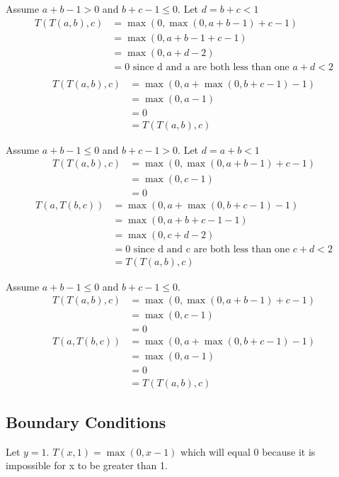 \documentclass{article}
\begin{document}
Assume $a+b-1 > 0$ and $b+c-1 \leq 0$. Let $d = b+c < 1$
\begin{align*}
	T(T(a,b),c) &= \max(0, \max(0, a+b-1) + c - 1)\\
				&= \max(0, a+b-1 + c - 1)\\
				&= \max(0, a+d-2)\\
				&=0 \text{ since d and a are both less than one } a+d < 2\\
\end{align*}
\begin{align*}
	T(T(a,b),c) &= \max(0, a + \max(0, b+c-1) - 1)\\
				&= \max(0, a - 1)\\
				&= 0\\
				&=T(T(a,b),c)
\end{align*}

Assume $a+b-1 \leq 0$ and $b+c-1 > 0$. Let $d = a+b < 1$
\begin{align*}
	T(T(a,b),c) &= \max(0, \max(0, a+b-1) + c - 1)\\
				&= \max(0, c - 1)\\
				&= 0
\end{align*}
\begin{align*}
	T(a,T(b,c)) &= \max(0, a+\max(0,b+c-1) - 1)\\
				&= \max(0, a+b+c-1 - 1)\\
				&= \max(0, c+d-2)\\
				&=0 \text{ since d and c are both less than one } c+d < 2\\
				&=T(T(a,b),c)
\end{align*}

Assume $a+b-1 \leq 0$ and $b+c-1 \leq 0$.
\begin{align*}
	T(T(a,b),c) &= \max(0, \max(0, a+b-1) + c - 1)\\
				&= \max(0, c - 1)\\
				&=0
\end{align*}
\begin{align*}
	T(a,T(b,c)) &= \max(0, a+\max(0,b+c-1) - 1)\\
				&= \max(0, a- 1)\\
				&=0\\
				&=T(T(a,b),c)
\end{align*}

\subsection*{Boundary Conditions}
Let $y=1$. $T(x,1) = \max(0, x-1)$ which will equal 0 because it is impossible for x to be greater than 1.
\end{document}
